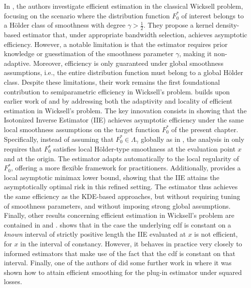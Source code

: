 In \cite{10}, the authors investigate efficient estimation in the classical Wicksell problem, focusing on the scenario where the distribution function $F^*_0$ of interest belongs to a H\"{o}lder class of smoothness with degree $\gamma > \frac{1}{2}$. They propose a kernel density-based estimator that, under appropriate bandwidth selection, achieves asymptotic efficiency. However, a notable limitation is that the estimator requires prior knowledge or guesstimation of the smoothness parameter $\gamma$, making it non-adaptive. Moreover, efficiency is only guaranteed under global smoothness assumptions, i.e., the entire distribution function must belong to a global H\"{o}lder class. Despite these limitations, their work remains the first foundational contribution to semiparametric efficiency in Wicksell's problem. \cite{27} builds upon earlier work of \cite{10} and \cite{1} by addressing both the adaptivity and locality of efficient estimation in Wicksell's problem. The key innovation consists in showing that the Isotonized Inverse Estimator (IIE) achieves asymptotic efficiency under the same local smoothness assumptions on the target function $F^*_0$ of the present chapter. Specifically, instead of assuming that $F^*_0 \in \Lambda_\gamma$ globally as in \cite{10}, the analysis in \cite{27} only requires that $F^*_0$ satisfies local H\"{o}lder-type smoothness at the evaluation point $x$ and at the origin. The estimator adapts automatically to the local regularity of $F^*_0$, offering a more flexible framework for practitioners. Additionally, \cite{27} provides a local asymptotic minimax lower bound, showing that the IIE attains the asymptotically optimal risk in this refined setting. The estimator thus achieves the same efficiency as the KDE-based approaches, but without requiring tuning of smoothness parameters, and without imposing strong global assumptions. Finally, other results concerning efficient estimation in Wicksell's problem are contained in \cite{50} and \cite{17}. \cite{50} shows that in the case the underlying cdf is constant on a \textit{known} interval of strictly positive length the IIE evaluated at $x$ is not efficient, for $x$ in the interval of constancy. However, it behaves in practice very closely to informed estimators that make use of the fact that the cdf is constant on that interval. Finally, one of the authors of \cite{10} did some further work in \cite{17} where it was shown how to attain efficient smoothing for the plug-in estimator under squared losses. 

